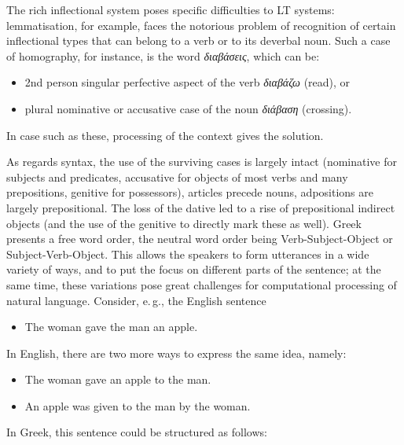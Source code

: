 \begin{multicols}{2}

The rich inflectional system poses specific difficulties to LT systems: lemmatisation, for example, faces the notorious problem of recognition of certain inflectional types that can belong to a verb or to its deverbal noun. Such a case of homography, for instance, is the word \textit{διαβάσεις}, which can be:

\begin{itemize}    
\item 2nd person singular perfective aspect of the verb \textit{διαβάζω} (read), or
\item plural nominative or accusative case of the noun \textit{διάβαση} (crossing).
\end{itemize}

In case such as these, processing of the context gives the solution.
   
As regards syntax, the use of the surviving cases is largely intact (nominative for subjects and predicates, accusative for objects of most verbs and many prepositions, genitive for possessors), articles precede nouns, adpositions are largely prepositional. The loss of the dative led to a rise of prepositional indirect objects (and the use of the genitive to directly mark these as well). Greek presents a free word order, the neutral word order being Verb-Subject-Object or Subject-Verb-Object. This allows the speakers to form utterances in a wide variety of ways, and to put the focus on different parts of the sentence; at the same time, these variations pose great challenges for computational processing of natural language. Consider, e.\,g., the English sentence

\begin{itemize}    
\item[] The woman gave the man an apple.
\end{itemize}

In English, there are two more ways to express the same idea, namely:

\begin{itemize}    
\item The woman gave an apple to the man.
\item An apple was given to the man by the woman.
\end{itemize}

In Greek, this sentence could be structured as follows:


\end{multicols}
